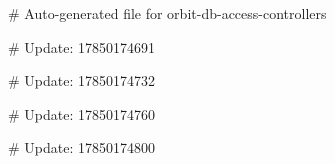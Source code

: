 # Auto-generated file for orbit-db-access-controllers

# Update: 17850174691

# Update: 17850174732

# Update: 17850174760

# Update: 17850174800

